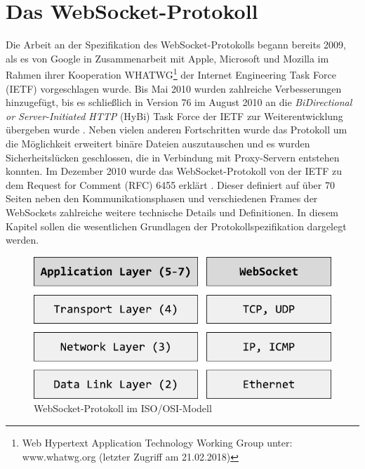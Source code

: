 \documentclass[11pt,a4paper,titlepage]{scrartcl}
\numberwithin{equation}{section}
\begin{document}
\section{Das WebSocket-Protokoll}\label{sec:WebSocketProtokoll}
Die Arbeit an der Spezifikation des WebSocket-Protokolls begann bereits 2009, als es von Google in Zusammenarbeit mit Apple, Microsoft und Mozilla im Rahmen ihrer Kooperation WHATWG\footnote{Web Hypertext Application Technology Working Group unter: www.whatwg.org (letzter Zugriff am 21.02.2018)} der Internet Engineering Task Force (IETF) vorgeschlagen wurde. Bis Mai 2010 wurden zahlreiche Verbesserungen hinzugefügt, bis es schließlich in Version 76 \autocite{hickson_websocket_2010} im August 2010 an die \textit{BiDirectional or Server-Initiated HTTP} (HyBi) Task Force der IETF zur Weiterentwicklung übergeben wurde \autocite{fette_websocket_2010}. Neben vielen anderen Fortschritten wurde das Protokoll um die Möglichkeit erweitert binäre Dateien auszutauschen und es wurden Sicherheitslücken geschlossen, die in Verbindung mit Proxy-Servern entstehen konnten. Im Dezember 2010 wurde das WebSocket-Protokoll von der IETF zu dem Request for Comment (RFC) 6455 erklärt \autocite{fette_websocket_2011}. Dieser definiert auf über 70 Seiten neben den Kommunikationsphasen und verschiedenen Frames der WebSockets zahlreiche weitere technische Details und Definitionen. In diesem Kapitel sollen die wesentlichen Grundlagen der Protokollspezifikation dargelegt werden.\\
\begin{figure}[ht] \label{fig:wsOSI}
\begin{center}
	\includegraphics[scale=1]{img/osi.pdf}
	\caption{WebSocket-Protokoll im ISO/OSI-Modell}
\end{center}
\end{figure}
\end{document}

